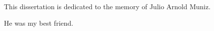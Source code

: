 
\par This dissertation is dedicated to the memory of Julio Arnold Muniz.
\par He was my best friend.
